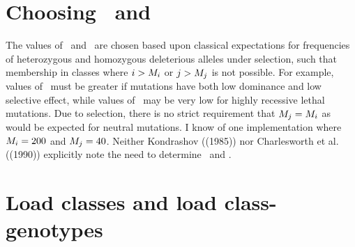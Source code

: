 \section{Choosing \Mi\ and \Mj}
The values of \Mi\ and \Mj\ are chosen based upon classical expectations for frequencies of heterozygous and homozygous deleterious alleles under selection, such that membership in classes where $i>\mbox{$M_{i}$}$ or $j>\mbox{$M_{j}$}$ is not possible.  For example, values of \Mi\ must be greater if mutations have both low dominance and low selective effect, while values of \Mj\ may be very low for highly recessive lethal mutations.  Due to selection, there is no strict requirement that $\mbox{$M_{j}$}=\mbox{$M_{i}$}$ as would be expected for neutral mutations.  I know of one implementation where $\mbox{$M_{i}$}=200$ and $\mbox{$M_{j}$}=40$.  Neither Kondrashov ((1985)) nor Charlesworth et al. ((1990)) explicitly note the need to determine \Mi\ and \Mj.

\section{Load classes and load class-genotypes}

